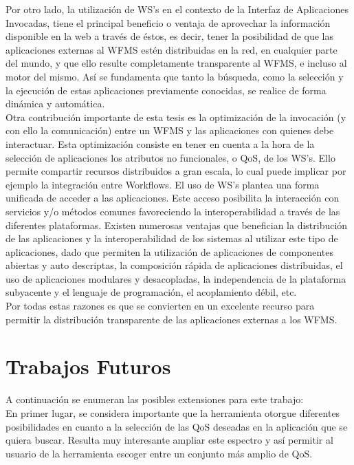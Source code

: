 Por otro lado, la utilización de WS's en el contexto de la Interfaz de Aplicaciones Invocadas, tiene el principal beneficio o ventaja de aprovechar la información disponible en la web a través de éstos, es decir, tener la posibilidad de que las aplicaciones externas al WFMS estén distribuidas en la red, en cualquier parte del mundo, y que ello resulte completamente transparente al WFMS, e incluso al motor del mismo. Así se fundamenta que tanto la búsqueda, como la selección y la ejecución de estas aplicaciones previamente conocidas, se realice de forma dinámica y automática.\\
Otra contribución importante de esta tesis es la optimización de la invocación (y con ello la comunicación) entre un WFMS y las aplicaciones con quienes debe interactuar. Esta optimización consiste en tener en cuenta a la hora de la selección de aplicaciones los atributos no funcionales, o QoS, de los WS's. Ello permite compartir recursos distribuidos a gran escala, lo cual puede implicar por ejemplo la integración entre Workflows.
El uso de WS's plantea una forma unificada de acceder a las aplicaciones. Este acceso posibilita la interacción con servicios y/o métodos comunes favoreciendo la interoperabilidad a través de las diferentes plataformas. Existen numerosas ventajas que benefician la distribución de las aplicaciones y la interoperabilidad de los sistemas al utilizar este tipo de aplicaciones, dado que permiten la utilización de aplicaciones de componentes abiertas y auto descriptas, la composición rápida de aplicaciones distribuidas, el uso de aplicaciones modulares y desacopladas, la independencia de la plataforma subyacente y el lenguaje de programación, el acoplamiento débil, etc.\\

Por todas estas razones es que se convierten en un excelente recurso para permitir la distribución transparente de las aplicaciones externas a los WFMS.

\section{Trabajos Futuros}

A continuación se enumeran las posibles extensiones para este trabajo:\\

En primer lugar, se considera importante que la herramienta otorgue diferentes posibilidades en cuanto a la selección de las QoS deseadas en la aplicación que se quiera buscar. Resulta muy interesante ampliar este espectro y así permitir al usuario de la herramienta escoger entre un conjunto más amplio de QoS.\\

